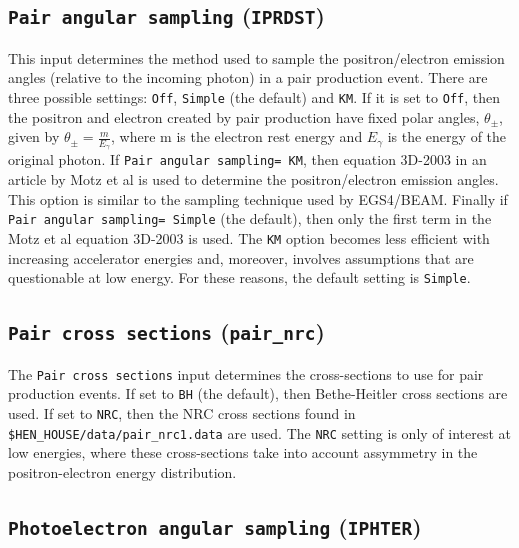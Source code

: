 \documentclass[12pt,twoside]{article}
\begin{document}
\subsection{ {\tt Pair angular sampling} ({\tt IPRDST})}

This input determines the method used to sample the positron/electron emission
angles (relative to the incoming photon) in a pair production event.  There
are three possible settings: {\tt Off}, {\tt Simple} (the default) and {\tt KM}.
If it is set to {\tt Off}, then the positron and electron created by pair
production have fixed polar angles, $\theta_{\pm}$, given by
$\theta_{\pm}=\frac{m}{E_{\gamma}}$, where m is the electron rest energy
and $E_{\gamma}$
is the energy of the original photon.
If {\tt Pair angular sampling= KM}, then equation 3D-2003 in an article
by Motz et al\cite{Mo69} is used to determine the positron/electron emission
angles.  This option is similar to the sampling technique used by
EGS4/BEAM.  Finally if {\tt Pair angular sampling= Simple} (the default), then only
the first term in the Motz et al equation 3D-2003 is used.  The {\tt KM} option
becomes less efficient with increasing accelerator energies and, moreover, involves
assumptions that are questionable at low energy.  For these reasons, the default
setting is {\tt Simple}.

\subsection{ {\tt Pair cross sections} ({\tt pair\_nrc})}

The {\tt Pair cross sections} input determines the cross-sections to
use for pair production events.  If set to {\tt BH} (the default), then
Bethe-Heitler cross sections are used.  If set to {\tt NRC}, then the
NRC cross sections found in {\tt \$HEN\_HOUSE/data/pair\_nrc1.data} are
used.  The {\tt NRC} setting is only of interest at low energies, where
these cross-sections take into account assymmetry in the positron-electron
energy distribution.

\subsection{ {\tt Photoelectron angular sampling} ({\tt IPHTER})}
\end{document}
